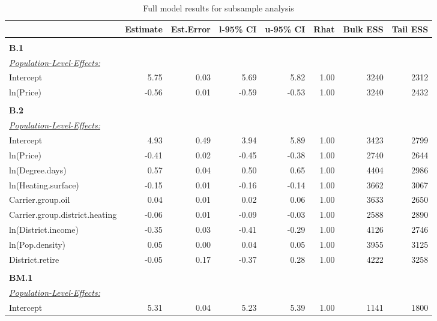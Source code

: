 \documentclass[12pt,twoside]{reedthesis}
\begin{document}
\tiny
\begin{longtable}[c]{lrrrrrrr}
\caption{Full model results for subsample analysis}
\label{tab:brms-full-model-results}\\
\cline{2-8}
 & \multicolumn{1}{c}{\textbf{Estimate}} & \multicolumn{1}{c}{\textbf{Est.Error}} & \multicolumn{1}{c}{\textbf{l-95\% CI}} & \multicolumn{1}{c}{\textbf{u-95\% CI}} & \multicolumn{1}{c}{\textbf{Rhat}} & \multicolumn{1}{c}{\textbf{Bulk ESS}} & \multicolumn{1}{c}{\textbf{Tail ESS}} \\ \cline{2-8} 
\endfirsthead
%
\endhead
%
\hline
\endfoot
%
\endlastfoot
%
 &  &  &  &  &  &  &  \\ \hline
\textbf{B.1} &  &  &  &  &  &  &  \\
{\ul \textit{Population-Level-Effects:}} &  &  &  &  &  &  &  \\
Intercept & 5.75 & 0.03 & 5.69 & 5.82 & 1.00 & 3240 & 2312 \\
ln(Price) & -0.56 & 0.01 & -0.59 & -0.53 & 1.00 & 3240 & 2432 \\ \hline
 &  &  &  &  &  &  &  \\ \hline
\textbf{B.2} &  &  &  &  &  &  &  \\
{\ul \textit{Population-Level-Effects:}} &  &  &  &  &  &  &  \\
Intercept & 4.93 & 0.49 & 3.94 & 5.89 & 1.00 & 3423 & 2799 \\
ln(Price) & -0.41 & 0.02 & -0.45 & -0.38 & 1.00 & 2740 & 2644 \\
ln(Degree.days) & 0.57 & 0.04 & 0.50 & 0.65 & 1.00 & 4404 & 2986 \\
ln(Heating.surface) & -0.15 & 0.01 & -0.16 & -0.14 & 1.00 & 3662 & 3067 \\
Carrier.group.oil & 0.04 & 0.01 & 0.02 & 0.06 & 1.00 & 3633 & 2650 \\
Carrier.group.district.heating & -0.06 & 0.01 & -0.09 & -0.03 & 1.00 & 2588 & 2890 \\
ln(District.income) & -0.35 & 0.03 & -0.41 & -0.29 & 1.00 & 4126 & 2746 \\
ln(Pop.density) & 0.05 & 0.00 & 0.04 & 0.05 & 1.00 & 3955 & 3125 \\
District.retire & -0.05 & 0.17 & -0.37 & 0.28 & 1.00 & 4222 & 3258 \\ \hline
 &  &  &  &  &  &  &  \\ \hline
\textbf{BM.1} &  &  &  &  &  &  &  \\
{\ul \textit{Population-Level-Effects:}} &  &  &  &  &  &  &  \\
Intercept & 5.31 & 0.04 & 5.23 & 5.39 & 1.00 & 1141 & 1800 \\

\end{longtable}
\end{document}
